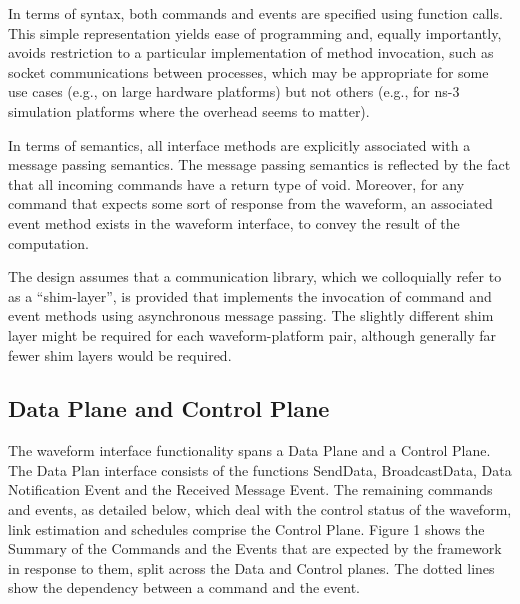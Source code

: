In terms of syntax, both commands and events are specified using function calls.  This simple representation yields ease of programming and, equally importantly, avoids restriction to a particular implementation of method invocation, such as socket communications between processes, which may be appropriate for some use cases (e.g., on large hardware platforms) but not others (e.g., for ns-3 simulation platforms where the overhead seems to matter).

In terms of semantics, all interface methods are explicitly associated with a message passing semantics.  The message passing semantics is reflected by the fact that all incoming commands have a return type of void.  Moreover, for any command that expects some sort of response from the waveform, an associated event method exists in the waveform interface, to convey the result of the computation.

The design assumes that a communication library, which we colloquially refer to as a “shim-layer”, is provided that implements the invocation of command and event methods using asynchronous message  passing.  The slightly different shim layer might be required for each waveform-platform pair, although generally far fewer shim layers would be required.

\subsection {Data Plane and Control Plane}
The waveform interface functionality spans a Data Plane and a Control Plane.  The Data Plan interface consists of the functions SendData, BroadcastData, Data Notification Event and the Received Message Event.  The remaining commands and events, as detailed below, which deal with the control status of the waveform, link estimation and schedules comprise the Control Plane. Figure 1 shows the Summary of the Commands and the Events that are expected by the framework in response to them, split across the Data and Control planes. The dotted lines show the dependency between a command and the event. 

